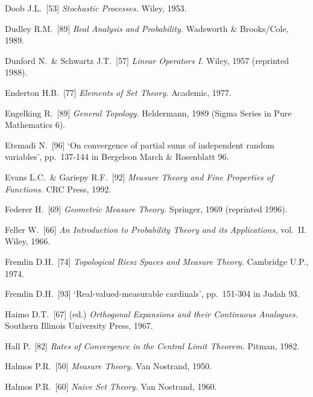 {Doob J.L.\ [53] {\it Stochastic Processes.}  Wiley, 1953.

Dudley R.M.\ [89] {\it Real Analysis and Probability.} Wadsworth \&
Brooks/Cole, 1989.   \cmmnt{[\S282 {\it notes}.]}

Dunford N.\ \& Schwartz J.T.\ [57] {\it Linear Operators I.}  Wiley,
1957 (reprinted 1988).  \cmmnt{[\S244 {\it notes}, 2A5J.]}

\medskip%

Enderton H.B.\ [77] {\it Elements of Set Theory.}   Academic, 1977.
\cmmnt{[\S2A1.]}

Engelking R.\ [89] {\it General Topology.} Heldermann, 1989 (Sigma
Series in Pure Mathematics 6).   \cmmnt{[2A5F.]}

Etemadi N.\ [96] `On convergence of partial sums of independent random
variables', pp.\ 137-144 in {\smc Bergelson March \& Rosenblatt 96}.
\cmmnt{[272V.]}

Evans L.C.\ \& Gariepy R.F.\ [92] {\it Measure Theory and Fine
Properties of Functions.}   CRC Press, 1992.
\cmmnt{[263Ec, \S265 {\it notes}.]}

\medskip%

Federer H.\ [69] {\it Geometric Measure Theory.}  Springer, 1969
(reprinted 1996).

Feller W.\ [66] {\it An Introduction to Probability Theory and its
Applications,} vol.\ II.   Wiley, 1966.  

Fremlin D.H.\ [74] {\it Topological Riesz Spaces and
Measure Theory.}   Cambridge U.P., 1974.

Fremlin D.H.\ [93] `Real-valued-measurable cardinals', pp.\ 151-304 in
{\smc Judah 93}.  \cmmnt{[232H.]}

\medskip%

Haimo D.T.\ [67] (ed.) {\it Orthogonal Expansions and their Continuous
Analogues.}   Southern Illinois University Press, 1967.

Hall P.\ [82] {\it Rates of Convergence in the Central Limit Theorem.}
Pitman, 1982.  \cmmnt{[274H.]}

Halmos P.R.\ [50] {\it Measure Theory.}  Van Nostrand, 1950.

Halmos P.R.\ [60] {\it Naive Set Theory.} Van Nostrand, 1960.
\cmmnt{[\S2A1.]}

}
